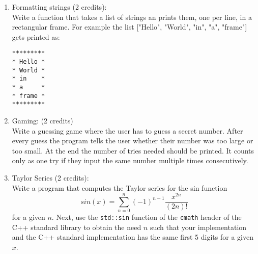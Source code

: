 \documentclass[11pt]{article}
\begin{document}
\begin{enumerate}

\item
Formatting strings (2 credits): \\
Write a function that takes a list of strings an prints them, one per line, in a rectangular frame. For example the list ["Hello", "World", "in", "a", "frame"] gets printed as:
\begin{lstlisting}
********* 
* Hello * 
* World * 
* in    * 
* a     *
* frame *
*********
\end{lstlisting}



\item Gaming: (2 credits)\\
Write a guessing game where the user has to guess a secret number. After every guess the program tells the user whether their number was too large or too small. At the end the number of tries needed should be printed. It counts only as one try if they input the same number multiple times consecutively.

\item Taylor Series (2 credits): \\
Write a program that computes the Taylor series for the sin function
$$
sin(x) = \sum\limits_{n=0}^n (-1)^{n-1} \frac{x^{2n}}{(2n)!} 
$$
for a given $n$. Next, use the \lstinline|std::sin| function of the \lstinline|cmath| header of the C++ standard library to obtain the need $n$ such that your implementation and the C++ standard implementation has the same first 5 digits for a given $x$.



\end{enumerate}

\doclicenseThis 
\end{document}
